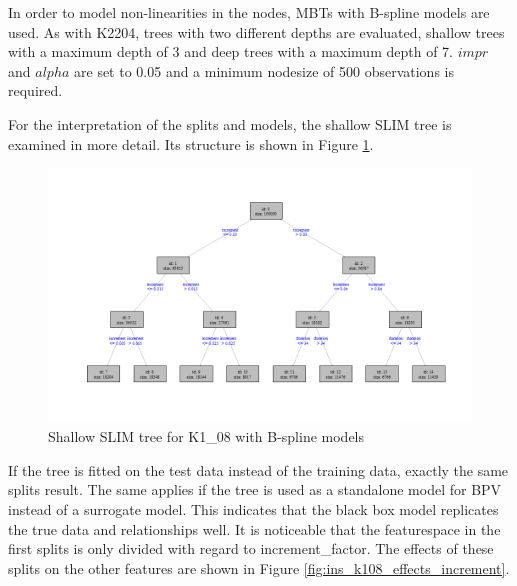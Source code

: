 In order to model non-linearities in the nodes, MBTs with B-spline models are used. As with K2204, trees with two different depths are evaluated, shallow trees with a maximum depth of 3 and deep trees with a maximum depth of 7. $impr$ and $alpha$ are set to 0.05 and a minimum nodesize of 500 observations is required.

For the interpretation of the splits and models, the shallow SLIM tree is examined in more detail. Its structure is shown in Figure \ref{fig:ins_k108_slim_bsplines_small_tree}.

\begin{figure}[!htb]
    \centering
    \includegraphics[width = 16cm]{Figures/insurance_use_case/k1_08_BPV/slim_bsplines_small_tree.png}
    \caption{Shallow SLIM tree for K1\_08 with B-spline models}
    \label{fig:ins_k108_slim_bsplines_small_tree}
\end{figure}

If the tree is fitted on the test data instead of the training data, exactly the same splits result. The same applies if the tree is used as a standalone model for BPV instead of a surrogate model. This indicates that the black box model replicates the true data and relationships well.
It is noticeable that the featurespace in the first splits is only divided with regard to increment\_factor. The effects of these splits on the other features are shown in Figure \ref{fig:ins_k108_effects_increment}.

